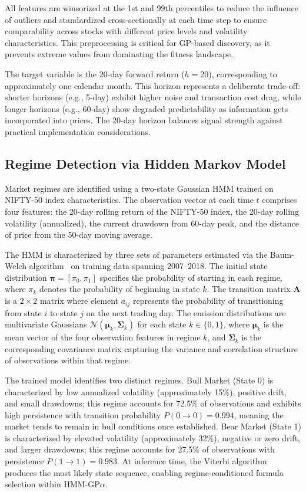 \documentclass{ieeeaccess}
\begin{document}
All features are winsorized at the 1st and 99th percentiles to reduce the influence of outliers and standardized cross-sectionally at each time step to ensure comparability across stocks with different price levels and volatility characteristics. This preprocessing is critical for GP-based discovery, as it prevents extreme values from dominating the fitness landscape.

The target variable is the 20-day forward return ($h = 20$), corresponding to approximately one calendar month. This horizon represents a deliberate trade-off: shorter horizons (e.g., 5-day) exhibit higher noise and transaction cost drag, while longer horizons (e.g., 60-day) show degraded predictability as information gets incorporated into prices. The 20-day horizon balances signal strength against practical implementation considerations.

\subsection{Regime Detection via Hidden Markov Model}
Market regimes are identified using a two-state Gaussian HMM trained on NIFTY-50 index characteristics. The observation vector at each time $t$ comprises four features: the 20-day rolling return of the NIFTY-50 index, the 20-day rolling volatility (annualized), the current drawdown from 60-day peak, and the distance of price from the 50-day moving average.

The HMM is characterized by three sets of parameters estimated via the Baum-Welch algorithm~\cite{b33} on training data spanning 2007--2018. The initial state distribution $\boldsymbol{\pi} = [\pi_0, \pi_1]$ specifies the probability of starting in each regime, where $\pi_k$ denotes the probability of beginning in state $k$. The transition matrix $\mathbf{A}$ is a $2 \times 2$ matrix where element $a_{ij}$ represents the probability of transitioning from state $i$ to state $j$ on the next trading day. The emission distributions are multivariate Gaussians $\mathcal{N}(\boldsymbol{\mu}_k, \boldsymbol{\Sigma}_k)$ for each state $k \in \{0, 1\}$, where $\boldsymbol{\mu}_k$ is the mean vector of the four observation features in regime $k$, and $\boldsymbol{\Sigma}_k$ is the corresponding covariance matrix capturing the variance and correlation structure of observations within that regime.

The trained model identifies two distinct regimes. Bull Market (State 0) is characterized by low annualized volatility (approximately 15\%), positive drift, and small drawdowns; this regime accounts for 72.5\% of observations and exhibits high persistence with transition probability $P(0 \rightarrow 0) = 0.994$, meaning the market tends to remain in bull conditions once established. Bear Market (State 1) is characterized by elevated volatility (approximately 32\%), negative or zero drift, and larger drawdowns; this regime accounts for 27.5\% of observations with persistence $P(1 \rightarrow 1) = 0.983$. At inference time, the Viterbi algorithm produces the most likely state sequence, enabling regime-conditioned formula selection within HMM-GP$\alpha$.
\end{document}
